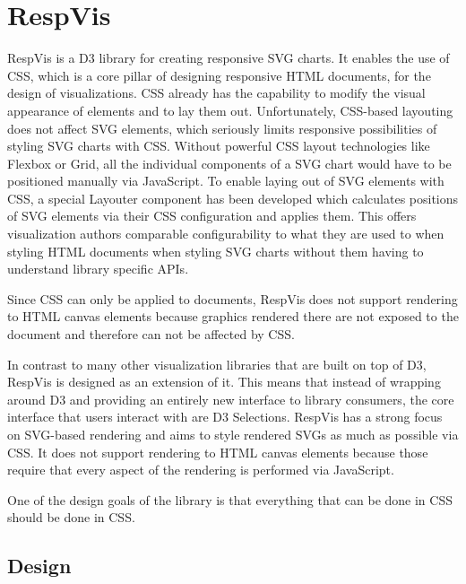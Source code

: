 \chapter{RespVis}
\label{chap:RespVis}

RespVis is a D3 library for creating responsive SVG charts.
It enables the use of CSS, which is a core pillar of designing responsive HTML documents, for the design of visualizations.
CSS already has the capability to modify the visual appearance of elements and to lay them out.
Unfortunately, CSS-based layouting does not affect SVG elements, which seriously limits responsive possibilities of styling SVG charts with CSS.
Without powerful CSS layout technologies like Flexbox or Grid, all the individual components of a SVG chart would have to be positioned manually via JavaScript.
To enable laying out of SVG elements with CSS, a special Layouter component has been developed which calculates positions of SVG elements via their CSS configuration and applies them.
This offers visualization authors comparable configurability to what they are used to when styling HTML documents when styling SVG charts without them having to understand library specific APIs.

Since CSS can only be applied to documents, RespVis does not support rendering to HTML canvas elements because graphics rendered there are not exposed to the document and therefore can not be affected by CSS.

In contrast to many other visualization libraries that are built on top of D3, RespVis is designed as an extension of it.
This means that instead of wrapping around D3 and providing an entirely new interface to library consumers, the core interface that users interact with are D3 Selections.
RespVis has a strong focus on SVG-based rendering and aims to style rendered SVGs as much as possible via CSS.
It does not support rendering to HTML canvas elements because those require that every aspect of the rendering is performed via JavaScript.

One of the design goals of the library is that everything that can be done in CSS should be done in CSS.





\section{Design}

